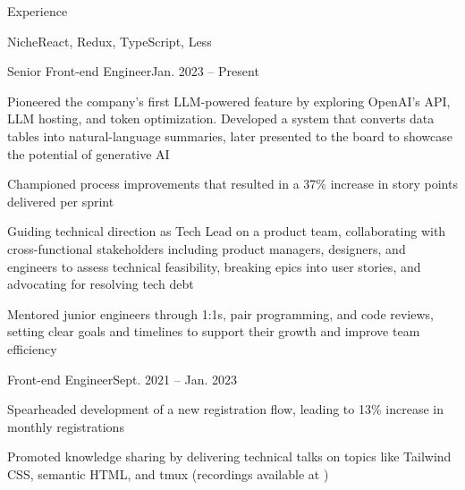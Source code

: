 \documentclass{resume} %
\begin{document}

\begin{rSection}{Experience}
\begin{rCompany}{Niche}{React, Redux, TypeScript, Less}{}{}
\begin{rPromotion}{}{}{Senior Front-end Engineer}{Jan. 2023 – Present}
\item Pioneered the company’s first LLM-powered feature by exploring OpenAI’s API, LLM hosting, and token optimization. Developed a system that converts data tables into natural-language summaries, later presented to the board to showcase the potential of generative AI\item Championed process improvements that resulted in a 37\% increase in story points delivered per sprint
\item Guiding technical direction as Tech Lead on a product team, collaborating with cross-functional stakeholders including product managers, designers, and engineers to assess technical feasibility, breaking epics into user stories, and advocating for resolving tech debt
\item Mentored junior engineers through 1:1s, pair programming, and code reviews, setting clear goals and timelines to support their growth and improve team efficiency
\end{rPromotion}


\begin{rRole}{}{}{Front-end Engineer}{Sept. 2021 – Jan. 2023}
\item Spearheaded development of a new registration flow, leading to 13\% increase in monthly registrations
\item Promoted knowledge sharing by delivering technical talks on topics like Tailwind CSS, semantic HTML, and tmux (recordings available at \href{http://jgs.lol/}{})
\end{rRole}
\end{rCompany}


\end{rSection}
\end{document}
